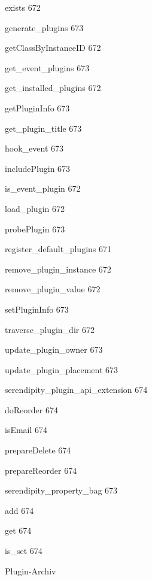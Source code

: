 \documentclass{book}
\renewcommand\subitem{\par}
\renewcommand\subsubitem{\par\hspace*{3mm}}
\begin{document}
\begin{multicols}{2}
\begin{osp-index}
      \subsubitem exists\hspace{1mm} 672
      \subsubitem generate\_plugins\hspace{1mm} 673
      \subsubitem getClassByInstanceID\hspace{1mm} 672
      \subsubitem get\_event\_plugins\hspace{1mm} 673
      \subsubitem get\_installed\_plugins\hspace{1mm} 672
      \subsubitem getPluginInfo\hspace{1mm} 673
      \subsubitem get\_plugin\_title\hspace{1mm} 673
      \subsubitem hook\_event\hspace{1mm} 673
      \subsubitem includePlugin\hspace{1mm} 673
      \subsubitem is\_event\_plugin\hspace{1mm} 672
      \subsubitem load\_plugin\hspace{1mm} 672
      \subsubitem probePlugin\hspace{1mm} 673
      \subsubitem register\_default\_plugins\hspace{1mm} 671
      \subsubitem remove\_plugin\_instance\hspace{1mm} 672
      \subsubitem remove\_plugin\_value\hspace{1mm} 672
      \subsubitem setPluginInfo\hspace{1mm} 673
      \subsubitem traverse\_plugin\_dir\hspace{1mm} 672
      \subsubitem update\_plugin\_owner\hspace{1mm} 673
      \subsubitem update\_plugin\_placement\hspace{1mm} 673
    \subitem serendipity\_plugin\_api\_extension\hspace{1mm} 674
      \subsubitem doReorder\hspace{1mm} 674
      \subsubitem isEmail\hspace{1mm} 674
      \subsubitem prepareDelete\hspace{1mm} 674
      \subsubitem prepareReorder\hspace{1mm} 674
    \subitem serendipity\_property\_bag\hspace{1mm} 673
      \subsubitem add\hspace{1mm} 674
      \subsubitem get\hspace{1mm} 674
      \subsubitem is\_set\hspace{1mm} 674
  \item Plugin-Archiv\hspace{1mm} 

\end{osp-index}
\end{multicols}
\end{document}
